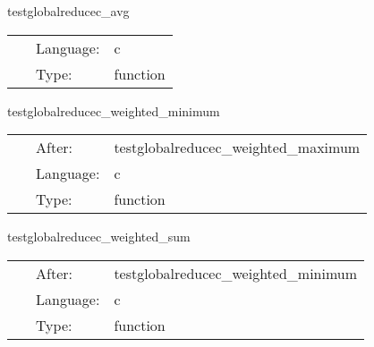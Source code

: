 \vspace{5mm}


\hspace{5mm} testglobalreducec\_avg 

\hspace{5mm}{\it test out gf reduction } 


\hspace{5mm}

 \begin{tabular*}{160mm}{cll} 
~ & Language:  & c \\ 
~ & Type:  & function \\ 
\end{tabular*} 


\vspace{5mm}


\hspace{5mm} testglobalreducec\_weighted\_minimum 

\hspace{5mm}{\it test weighted global minimum reduction } 


\hspace{5mm}

 \begin{tabular*}{160mm}{cll} 
~ & After:  & testglobalreducec\_weighted\_maximum \\ 
~ & Language:  & c \\ 
~ & Type:  & function \\ 
\end{tabular*} 


\vspace{5mm}


\hspace{5mm} testglobalreducec\_weighted\_sum 

\hspace{5mm}{\it test weighted global sum reduction } 


\hspace{5mm}

 \begin{tabular*}{160mm}{cll} 
~ & After:  & testglobalreducec\_weighted\_minimum \\ 
~ & Language:  & c \\ 
~ & Type:  & function \\ 
\end{tabular*} 


